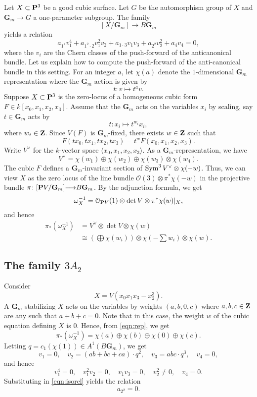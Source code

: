 \documentclass[12pt,reqno]{amsart}
\renewcommand{\to}{{\longrightarrow}}
\numberwithin{equation}{section}
\renewcommand{\O}{\mathcal O}
\newcommand{\G}{\mathbf G}
\begin{document}
Let $X \subset \P^3$ be a good cubic surface.
Let $G$ be the automorphism group of $X$ and $\G_m \to G$ a one-parameter subgroup.
The family
\[ [X/\G_m] \to B\G_m\]
yields a relation
\begin{equation}\label{eqn:isorel}
  a_{1^4}v_1^4 + a_{1^2\cdot 2} v_1^2v_2 + a_{1\cdot 3} v_1v_3 + a_{2^2}v_2^2 + a_4 v_4 = 0,
\end{equation}
where the $v_i$ are the Chern classes of the push-forward of the anticanonical bundle.
Let us explain how to compute the push-forward of the anti-canonical bundle in this setting.
For an integer $a$, let $\chi(a)$ denote the $1$-dimensional $\G_m$ representation where the $\G_m$ action is given by
\[ t \colon v \mapsto t^a v.\]
Suppose $X \subset \P^3$ is the zero-locus of a homogeneous cubic form $F \in k[x_0,x_1,x_2,x_3]$.
Assume that the $\G_m$ acts on the variables $x_i$ by scaling, say $t \in \G_m$ acts by
\[ t \colon x_i \mapsto t^{w_i}x_i,\]
where $w_i \in \Z$.
Since $V(F)$ is $\G_m$-fixed, there exists $w \in \Z$ such that
\[ F \left(t x_0, t x_1, t x_2, t x_3\right) = t^w F\left(x_0, x_1, x_2,x_3\right).\]
Write $V^\vee$ for the $k$-vector space $\langle x_0, x_1, x_2,x_3 \rangle$.
As a $\G_m$-representation, we have
\[ V^\vee = \chi(w_1) \oplus \chi(w_2) \oplus \chi(w_3) \otimes \chi(w_4).\]
The cubic $F$ defines a $\G_m$-invariant section of $\Sym^3 V^\vee \otimes \chi(-w)$.
Thus, we can view $X$ as the zero locus of the line bundle $\O(3) \otimes \pi^*\chi(-w)$ in the projective bundle $\pi \colon [\P V/\G_m] \to B\G_m$.
By the adjunction formula, we get
\[ \omega_X^{-1} = \O_{\P V}(1) \otimes \det V \otimes \pi^*\chi(w) |_X,\]
and hence
\begin{equation}\label{eqn:rep}
\begin{split}
  \pi_*\left( \omega_X^{-1} \right) &= V^\vee \otimes \det V \otimes \chi(w) \\
  &\cong \left( \bigoplus \chi(w_i)  \right) \otimes \chi\left(-\sum w_i\right) \otimes \chi(w).
\end{split}
\end{equation}

\subsection{The family $3A_2$}
Consider
\[ X = V(x_0x_1x_3 - x_2^3).\]
A $\G_m$ stabilizing $X$ acts on the variables by weights $(a,b,0,c)$ where $a,b,c \in \Z$ are any such that $a+b+c = 0$.
Note that in this case, the weight $w$ of the cubic equation defining $X$ is $0$.
Hence, from \eqref{eqn:rep}, we get
\[ \pi_*\left(\omega^{-1}_X\right) = \chi(a) \oplus \chi(b) \oplus \chi(0) \oplus \chi(c).\]
Letting $q = c_1(\chi(1)) \in A^1(B\G_m)$, we get
\[ v_1 = 0, \quad v_2 = (ab+bc+ca) \cdot q^2, \quad v_3 = abc \cdot q^3, \quad v_4 = 0,\]
and hence
\[ v_1^4 = 0, \quad v_1^2v_2 = 0, \quad v_1v_3 = 0,\quad v_2^2 \neq 0, \quad v_4 = 0.\]
Substituting in \eqref{eqn:isorel} yields the relation
\begin{equation}\label{eqn:iso1}
  a_{2^2} = 0.
\end{equation}
\end{document}
